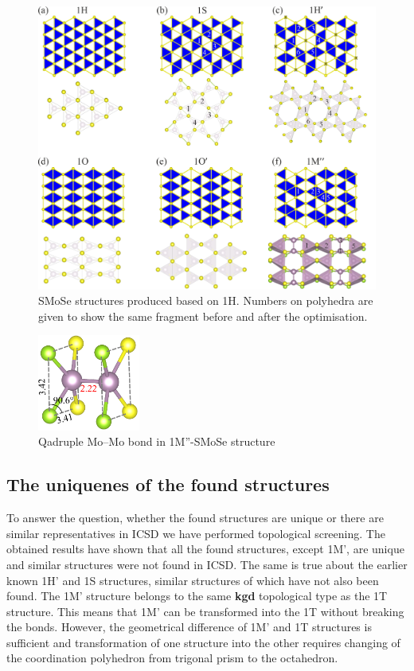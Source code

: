 \documentclass[a4paperm]{article}
\begin{document}
\begin{figure}[H] \centering
        \includegraphics[width=\textwidth]{H-based.png}
        \caption{SMoSe structures produced based on 1H. Numbers on polyhedra are given to show the same fragment before and after the optimisation.}
\label{H-based}
\end{figure}

\begin{figure}[H]
	\includegraphics[width=0.3\textwidth]{test3_momo.png}
	\caption{Qadruple Mo--Mo bond in 1M''-SMoSe structure}
\label{test3_momo}
\end{figure}




\subsection{The uniquenes of the found structures}

To answer the question, whether the found structures are unique or there are similar representatives in ICSD we have performed topological screening.
The obtained results have shown that all the found structures, except 1M', are unique and similar structures were not found in ICSD.
The same is true about the earlier known 1H' and 1S structures, similar structures of which have not also been found. 
The 1M' structure belongs to the same {\bf kgd} topological type as the 1T structure.
This means that 1M' can be transformed into the 1T without breaking the bonds.
However, the geometrical difference of 1M' and 1T structures is sufficient and transformation of one structure into the other requires changing of the coordination polyhedron from trigonal prism to the octahedron.
\end{document}
